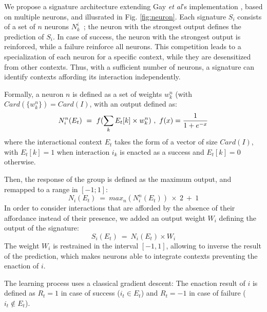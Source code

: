 \documentclass[conference]{IEEEtran}
\begin{document}

We propose a signature architecture extending Gay \textit{et al}'s implementation \cite{gay:space}, based on multiple neurons, and illusrated in Fig. \ref{fig:neuron}. Each signature $S_i$ consists of a set of $n$ neurons $N_k^i$~; the neuron with the strongest output defines the prediction of $S_i$. In case of success, the neuron with the strongest output is reinforced, while a failure reinforce all neurons. This competition leads to a specialization of each neuron for a specific context, while they are desensitized from other contexts. Thus, with a sufficient number of neurons, a signature can identify contexts affording its interaction independently.

Formally, a neuron $n$ is defined as a set of weights $w_k^n$ (with $Card(\{w_k^n\})=Card(I)$, with an output defined as:
\begin{equation}
N_i^n(E_t)~=~f(\sum_{k} E_t[k] \times w_k^n)~,~ f(x) = { {1}\over{1+e^{-x} }}
\end{equation}
where the interactional context $E_t$ takes the form of a vector of size $Card(I)$, with $E_t[k]=1$ when interaction $i_k$ is enacted as a success and $E_t[k]=0$ otherwise.

Then, the response of the group is defined as the maximum output, and remapped to a range in $[-1;1]$:
\begin{equation}
N_i(E_t)~=~max_n (N_i^n(E_t) ) \: \times \: 2 ~+~ 1
\end{equation}
In order to consider interactions that are afforded by the absence of their affordance instead of their presence, we added an output weight $W_i$ defining the output of the signature:
\begin{equation}
S_i(E_t)~=~N_i(E_t) \times W_i
\end{equation}
The weight $W_i$ is restrained in the interval $[-1,1]$, allowing to inverse the result of the prediction, which makes neurons able to integrate contexts preventing the enaction of $i$.

The learning process uses a classical gradient descent:
The enaction result of $i$ is defined as $R_t=1$ in case of success ($i_t \in E_t$) and $R_t=-1$ in case of failure ($i_t \not\in E_t$).
\end{document}
